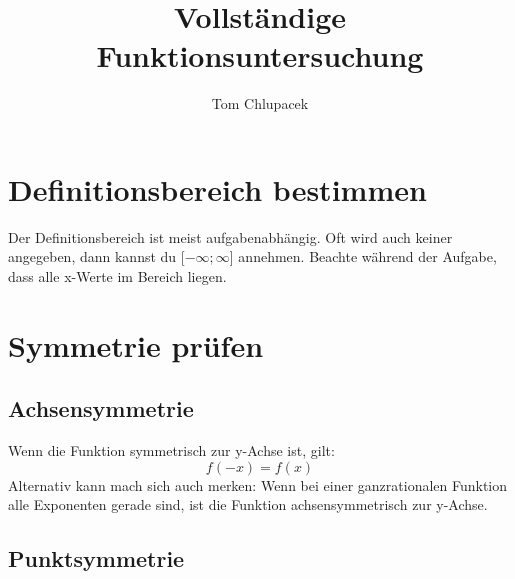 \documentclass[11pt]{article}
\title{\textbf{Vollständige Funktionsuntersuchung}}
\author{Tom Chlupacek}
\begin{document}
\maketitle
\section{Definitionsbereich bestimmen}
Der Definitionsbereich ist meist aufgabenabhängig. Oft wird auch keiner angegeben, dann kannst du [$-\infty;\infty$] annehmen. Beachte während der Aufgabe, dass alle x-Werte im Bereich liegen. 

\section{Symmetrie prüfen}
\subsection{Achsensymmetrie}
Wenn die Funktion symmetrisch zur y-Achse ist, gilt: 
\begin{equation} f(-x) = f(x) \end{equation}
Alternativ kann mach sich auch merken: Wenn bei einer ganzrationalen Funktion alle Exponenten gerade sind, ist die Funktion achsensymmetrisch zur y-Achse.
\subsection{Punktsymmetrie}
  
\end{document}
